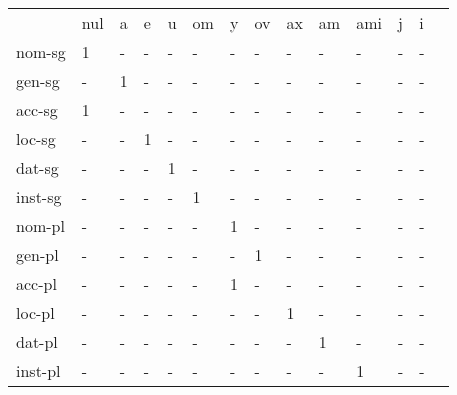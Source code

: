 \documentclass{article}
\begin{document}
\begin{tabular}{llllllllllllll}\toprule
                &nul     &a       &e       &u       &om      &y       &ov      &ax      &am      &ami     &j       &i       \\ 
nom-sg     &     1  &    -   &    -   &    -   &    -   &    -   &    -   &    -   &    -   &    -   &    -   &    -   \\ 
gen-sg     &    -   &     1  &    -   &    -   &    -   &    -   &    -   &    -   &    -   &    -   &    -   &    -   \\ 
acc-sg     &     1  &    -   &    -   &    -   &    -   &    -   &    -   &    -   &    -   &    -   &    -   &    -   \\ 
loc-sg     &    -   &    -   &     1  &    -   &    -   &    -   &    -   &    -   &    -   &    -   &    -   &    -   \\ 
dat-sg     &    -   &    -   &    -   &     1  &    -   &    -   &    -   &    -   &    -   &    -   &    -   &    -   \\ 
inst-sg    &    -   &    -   &    -   &    -   &     1  &    -   &    -   &    -   &    -   &    -   &    -   &    -   \\ 
nom-pl     &    -   &    -   &    -   &    -   &    -   &     1  &    -   &    -   &    -   &    -   &    -   &    -   \\ 
gen-pl     &    -   &    -   &    -   &    -   &    -   &    -   &     1  &    -   &    -   &    -   &    -   &    -   \\ 
acc-pl     &    -   &    -   &    -   &    -   &    -   &     1  &    -   &    -   &    -   &    -   &    -   &    -   \\ 
loc-pl     &    -   &    -   &    -   &    -   &    -   &    -   &    -   &     1  &    -   &    -   &    -   &    -   \\ 
dat-pl     &    -   &    -   &    -   &    -   &    -   &    -   &    -   &    -   &     1  &    -   &    -   &    -   \\ 
inst-pl    &    -   &    -   &    -   &    -   &    -   &    -   &    -   &    -   &    -   &     1  &    -   &    -   \\ 
\end{tabular}

 \vspace{0.2in}
\end{document}

